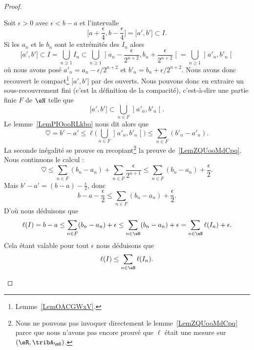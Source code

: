 \begin{proof}
\begin{subproof}
            Soit \( \epsilon>0\) avec \( \epsilon<b-a\) et l'intervalle
            \begin{equation}
                \mathopen[ a+\frac{ \epsilon }{ 4 } , b-\frac{ \epsilon }{ 4 } \mathclose]=\mathopen[ a' , b' \mathclose]\subset I.
            \end{equation}
            Si les \( a_n\) et le \( b_n\) sont le extrémités des \( I_n\) alors
            \begin{equation}
                \mathopen[ a' , b' \mathclose]\subset I=\bigcup_{n\geq 1}I_n\subset\bigcup_{n\geq 1}\mathopen] a_n-\frac{ \epsilon }{ 2^{n+2} } , b_n+\frac{ \epsilon }{ 2^{n+2} } \mathclose[=\bigcup_{n\geq 1}\mathopen] a'_n , b'_n \mathclose[
            \end{equation}
            où nous avons posé \( a'_n=a_n-\epsilon/2^{n+2}\) et \( b'_n=b_n+\epsilon/2^{n+2}\). Nous avons donc recouvert le compact\footnote{Lemme~\ref{LemOACGWxV}.} \( \mathopen[ a' , b' \mathclose]\) par des ouverts. Nous pouvons donc en extraire un sous-recouvrement fini (c'est la définition de la compacité), c'est-à-dire une partie finie \( F\) de \( \eN\) telle que
            \begin{equation}
                \mathopen[ a' , b' \mathclose]\subset \bigcup_{n\in F}\mathopen] a'_n , b'_n \mathclose[.
            \end{equation}
            Le lemme~\ref{LemPIOooRLkbo} nous dit alors que
            \begin{equation}
                \heartsuit=b'-a'\leq \ell\big( \bigcup_{n\in F}\mathopen] a'_n , b'_n \mathclose[ \big)\leq \sum_{n\in F}(b'_n-a'_n).
            \end{equation}
            La seconde inégalité se prouve en recopiant\footnote{Nous ne pouvons pas invoquer directement le lemme~\ref{LemZQUooMdCpq} parce que nous n'avons pas encore prouvé que $\ell$ était une mesure sur $ (\eR,\tribA_{\mS})$.} la preuve de~\ref{LemZQUooMdCpq}. Nous continuons le calcul :
            \begin{equation}
                \heartsuit\leq\sum_{n\in F}(b_n-a_n)+\sum_{n\in F}\frac{ \epsilon }{ 2^{n+1} }\leq \sum_{n\in F}(b_n-a_n)+\frac{ \epsilon }{2}.
            \end{equation}
            Mais \( b'-a'=(b-a)-\frac{ \epsilon }{2}\), donc
            \begin{equation}
                b-a-\frac{ \epsilon }{2}\leq \sum_{n\in F}(b_n-a_n)+\frac{ \epsilon }{2}.
            \end{equation}
            D'où nous déduisons que
            \begin{equation}
                \ell(I)=b-a\leq \sum_{n\in F}(b_n-a_n)+\epsilon\leq \sum_{n\in \eN}(b_n-a_n)+\epsilon=\sum_{n\in \eN}\ell(I_n)+\epsilon.
            \end{equation}
            Cela étant valable pour tout \( \epsilon\) nous déduisons que
            \begin{equation}
                \ell(I)\leq\sum_{n\in \eN}\ell(I_n).
            \end{equation}


\end{subproof}
\end{proof}
